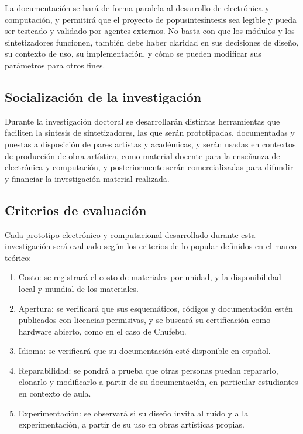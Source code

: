\documentclass[../candidatura.tex]{subfiles}
\begin{document}
La documentación se hará de forma paralela al desarrollo de electrónica y computación, y permitirá que el proyecto de popusintesíntesis sea legible y pueda ser testeado y validado por agentes externos. No basta con que los módulos y los sintetizadores funcionen, también debe haber claridad en sus decisiones de diseño, su contexto de uso, su implementación, y cómo se pueden modificar sus parámetros para otros fines.

\subsection{Socialización de la investigación}

Durante la investigación doctoral se desarrollarán distintas herramientas que faciliten la síntesis de sintetizadores, las que serán prototipadas, documentadas y puestas a disposición de pares artistas y académicas, y serán usadas en contextos de producción de obra artística, como material docente para la enseñanza de electrónica y computación, y posteriormente serán comercializadas para difundir y financiar la investigación material realizada.

\subsection{Criterios de evaluación}

Cada prototipo electrónico y computacional desarrollado durante esta investigación será evaluado según los criterios de lo popular definidos en el marco teórico:

\begin{enumerate}
    \item Costo: se registrará el costo de materiales por unidad, y la disponibilidad local y mundial de los materiales.
    \item Apertura: se verificará que sus esquemáticos, códigos y documentación estén publicados con licencias permisivas, y se buscará su certificación como hardware abierto, como en el caso de Chufebu.
    \item Idioma: se verificará que su documentación esté disponible en español.
    \item Reparabilidad: se pondrá a prueba que otras personas puedan repararlo, clonarlo y modificarlo a partir de su documentación, en particular estudiantes en contexto de aula.
    \item Experimentación: se observará si su diseño invita al ruido y a la experimentación, a partir de su uso en obras artísticas propias.
\end{enumerate}
\end{document}
